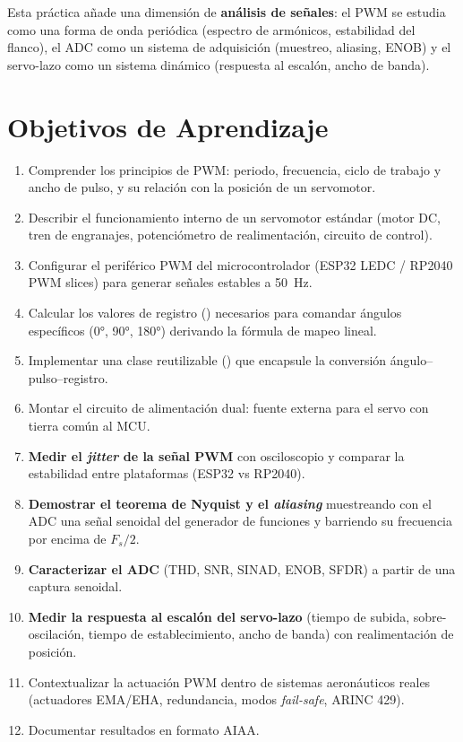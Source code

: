 \documentclass[11pt]{article}
\begin{document}
Esta práctica añade una dimensión de \textbf{análisis de señales}: el PWM se estudia
como una forma de onda periódica (espectro de armónicos, estabilidad del flanco), el
ADC como un sistema de adquisición (muestreo, aliasing, ENOB) y el servo-lazo como un
sistema dinámico (respuesta al escalón, ancho de banda).

\section{Objetivos de Aprendizaje}
\begin{enumerate}
  \item Comprender los principios de PWM: periodo, frecuencia, ciclo de trabajo y ancho
        de pulso, y su relación con la posición de un servomotor.
  \item Describir el funcionamiento interno de un servomotor estándar (motor DC, tren de
        engranajes, potenciómetro de realimentación, circuito de control).
  \item Configurar el periférico PWM del microcontrolador (ESP32 LEDC / RP2040 PWM
        slices) para generar señales estables a \SI{50}{\hertz}.
  \item Calcular los valores de registro () necesarios para comandar
        ángulos específicos (0\si{\degree}, 90\si{\degree}, 180\si{\degree}) derivando la
        fórmula de mapeo lineal.
  \item Implementar una clase reutilizable () que encapsule la conversión
        ángulo--pulso--registro.
  \item Montar el circuito de alimentación dual: fuente externa para el servo con tierra
        común al MCU.
  \item \textbf{Medir el \emph{jitter} de la señal PWM} con osciloscopio y comparar la
        estabilidad entre plataformas (ESP32 vs RP2040).
  \item \textbf{Demostrar el teorema de Nyquist y el \emph{aliasing}} muestreando con el
        ADC una señal senoidal del generador de funciones y barriendo su frecuencia por
        encima de $F_s/2$.
  \item \textbf{Caracterizar el ADC} (THD, SNR, SINAD, ENOB, SFDR) a partir de una
        captura senoidal.
  \item \textbf{Medir la respuesta al escalón del servo-lazo} (tiempo de subida,
        sobre-oscilación, tiempo de establecimiento, ancho de banda) con realimentación
        de posición.
  \item Contextualizar la actuación PWM dentro de sistemas aeronáuticos reales
        (actuadores EMA/EHA, redundancia, modos \emph{fail-safe}, ARINC 429).
  \item Documentar resultados en formato AIAA.
\end{enumerate}
\end{document}
